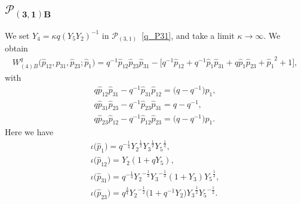 \documentclass[10pt,a4paper]{amsart}
\numberwithin{equation}{section}
\begin{document}
\subsection[$\mathcal{P}_{(3,1)B}$]{$\boldsymbol{\mathcal{P}_{(3,1)B}}$}
We set $Y_4 = \kappa q( Y_5 Y_2)^{-1}$ in $\mathcal{P}_{(3,1)}$~\eqref{q_P31}, and take a limit $\kappa\to\infty$. We obtain
\begin{gather*}
 W^q_{(4)B}\big( \hat{p}_{12}, \hat{p}_{31}, \hat{p}_{23}; \hat{p}_1 \big) = q^{-1} \hat{p}_{12} \hat{p}_{23} \hat{p}_{31} -\big[ q^{-1} \hat{p}_{12} + q^{-1} \hat{p}_1 \hat{p}_{31} + q \hat{p}_1 \hat{p}_{23}
 + {\hat{p}_1}^{2} + 1\big],
\end{gather*}
with
\begin{gather*}
 q \hat{p}_{12} \hat{p}_{31} - q^{-1} \hat{p}_{31} \hat{p}_{12} =\big( q - q^{-1}\big) \hat{p}_1 , \\
 q \hat{p}_{31} \hat{p}_{23} - q^{-1} \hat{p}_{23} \hat{p}_{31} = q - q^{-1} , \\
 q \hat{p}_{23} \hat{p}_{12} - q^{-1} \hat{p}_{12} \hat{p}_{23} =\big( q - q^{-1}\big) \hat{p}_1 .
\end{gather*}
Here we have
\begin{gather*}
 \iota\big(\hat{p}_1\big)= q^{-\frac{1}{4}} {Y_2}^{\frac{1}{2}} {Y_3}^{\frac{1}{2}} {Y_5}^{\frac{1}{2}} , \\
 \iota\big(\hat{p}_{12}\big) = {Y_2} ( 1 + q Y_5 ) , \\
 \iota\big(\hat{p}_{31}\big) = q^{-\frac{1}{4}} {Y_2}^{-\frac{1}{2}} {Y_3}^{-\frac{1}{2}}( 1 + {Y_3}) {Y_5}^{\frac{1}{2}} , \\
 \iota\big(\hat{p}_{23}\big) = q^{\frac{3}{4}} {Y_2}^{-\frac{1}{2}} \big( 1 + q^{-1} {Y_2} \big) {Y_3}^{\frac{1}{2}} {Y_5}^{-\frac{1}{2}}.
\end{gather*}
\end{document}
